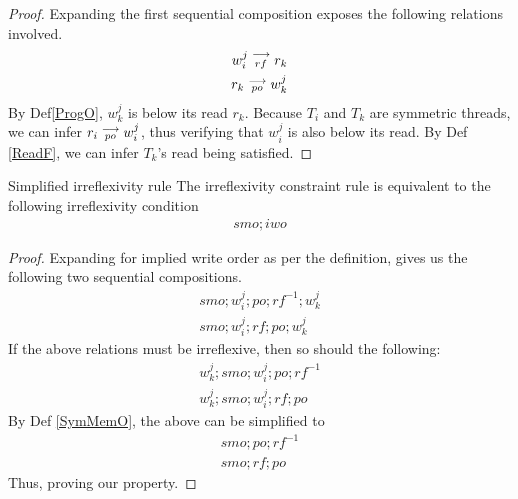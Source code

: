    \begin{proof}
        Expanding the first sequential composition exposes the following relations involved. 
        \begin{align*}
            w_i^j\stackrel{\longrightarrow}{_{rf}}r_k \\ 
            r_k\stackrel{\longrightarrow}{_{po}}w_k^j
        \end{align*}
        By Def\ref{ProgO}, $w_k^j$ is below its read $r_k$. Because $T_i$ and $T_k$ are symmetric threads, we can infer $r_i\stackrel{\longrightarrow}{_{po}}w_i^j$, thus verifying that $w_i^j$ is also below its read.
        By Def \ref{ReadF}, we can infer $T_k$'s read being satisfied. 
    \end{proof}


    \begin{property}{Simplified irreflexivity rule}
        \label{prop1}
        The irreflexivity constraint rule is equivalent to the following irreflexivity condition 
        \begin{align*}
            smo;iwo
        \end{align*}
    \end{property}

    \begin{proof}
        Expanding for implied write order as per the definition, gives us the following two sequential compositions. 
        \begin{align*}
            smo;w_i^j;po;rf^{-1};w_k^j \\
            smo;w_i^j;rf;po;w_k^j 
        \end{align*}
        If the above relations must be irreflexive, then so should the following: 
        \begin{align*}
            w_k^j;smo;w_i^j;po;rf^{-1} \\
            w_k^j;smo;w_i^j;rf;po     
        \end{align*}
        By Def \ref{SymMemO}, the above can be simplified to
        \begin{align*}
            smo;po;rf^{-1} \\
            smo;rf;po 
        \end{align*}
        Thus, proving our property. 
    \end{proof}



